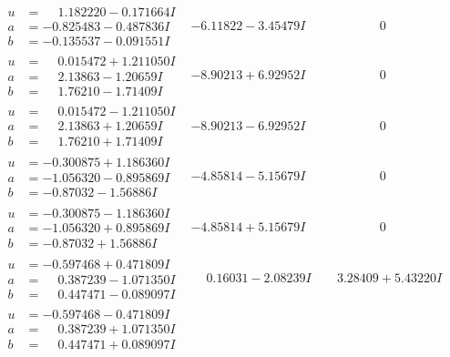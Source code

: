 \documentclass[1p]{elsarticle_modified}
\theoremstyle{definition}
\begin{document}
$$\begin{array}{c|c|c}
\begin{aligned}
u &= \phantom{-}1.182220 - 0.171664 I \\
a &= -0.825483 - 0.487836 I \\
b &= -0.135537 - 0.091551 I\end{aligned}
 & -6.11822 - 3.45479 I & \phantom{-0.000000 } 0 \\ \hline\begin{aligned}
u &= \phantom{-}0.015472 + 1.211050 I \\
a &= \phantom{-}2.13863 - 1.20659 I \\
b &= \phantom{-}1.76210 - 1.71409 I\end{aligned}
 & -8.90213 + 6.92952 I & \phantom{-0.000000 } 0 \\ \hline\begin{aligned}
u &= \phantom{-}0.015472 - 1.211050 I \\
a &= \phantom{-}2.13863 + 1.20659 I \\
b &= \phantom{-}1.76210 + 1.71409 I\end{aligned}
 & -8.90213 - 6.92952 I & \phantom{-0.000000 } 0 \\ \hline\begin{aligned}
u &= -0.300875 + 1.186360 I \\
a &= -1.056320 - 0.895869 I \\
b &= -0.87032 - 1.56886 I\end{aligned}
 & -4.85814 - 5.15679 I & \phantom{-0.000000 } 0 \\ \hline\begin{aligned}
u &= -0.300875 - 1.186360 I \\
a &= -1.056320 + 0.895869 I \\
b &= -0.87032 + 1.56886 I\end{aligned}
 & -4.85814 + 5.15679 I & \phantom{-0.000000 } 0 \\ \hline\begin{aligned}
u &= -0.597468 + 0.471809 I \\
a &= \phantom{-}0.387239 - 1.071350 I \\
b &= \phantom{-}0.447471 - 0.089097 I\end{aligned}
 & \phantom{-}0.16031 - 2.08239 I & \phantom{-}3.28409 + 5.43220 I \\ \hline\begin{aligned}
u &= -0.597468 - 0.471809 I \\
a &= \phantom{-}0.387239 + 1.071350 I \\
b &= \phantom{-}0.447471 + 0.089097 I\end{aligned}

\end{array}$$
\end{document}
